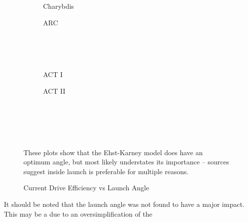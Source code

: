 \begin{figure*}[h!]
    \centering
    \hfill
    \begin{subfigure}[t]{0.4\textwidth}
        \centering
    \begin{adjustbox}{width=\textwidth}
      \Large
      
    \end{adjustbox}
        \caption{Charybdis}
    \end{subfigure}
    \hfill
    \begin{subfigure}[t]{0.4\textwidth}
        \centering
    \begin{adjustbox}{width=\textwidth}
      \Large
      
    \end{adjustbox}
        \caption{ARC}
    \end{subfigure}
    \hfill \hfill ~\\ ~\\ ~\\
    \hfill
    \begin{subfigure}[t]{0.4\textwidth}
        \centering
    \begin{adjustbox}{width=\textwidth}
      \Large
      
    \end{adjustbox}
        \caption{ACT I}
    \end{subfigure}
    \hfill
    \begin{subfigure}[t]{0.4\textwidth}
        \centering
    \begin{adjustbox}{width=\textwidth}
      \Large
      
    \end{adjustbox}
        \caption{ACT II}
    \end{subfigure}
    \hfill \hfill ~\\ ~\\ ~\\
    \caption{Current Drive Efficiency vs Launch Angle}
    \label{fig:launch_angle} ~ \\
    \small{ These plots show that the Ehst-Karney model does have an optimum angle, but most likely understates its importance -- sources suggest inside launch is preferable for multiple reasons.\cite{adx} }
\end{figure*}

It should be noted that the launch angle was not found to have a major impact. This may be a due to an oversimplification of the 

%
